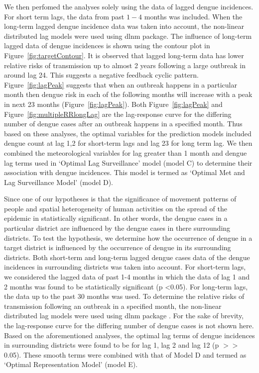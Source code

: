 \documentclass{bmcart}
\begin{document}
We then perfomed the analyses solely using the data of lagged dengue incidences. For short term lags, the data from past $1-4$ months was included. When the long-term lagged dengue incidence data was taken into account, the non-linear distributed lag models were used using dlnm package\cite{gasparrini2011distributed}. The influence of long-term lagged data of dengue incidences is shown using the contour plot in Figure~\ref{fig:targetContour}. It is observed that lagged long-term data has lower relative risks of transmission up to almost 2 years following a large outbreak in around lag 24. This suggests a negative feedback cyclic pattern. Figure~\ref{fig:lagPeak} suggests that when an outbreak happens in a particular month then dengue risk in each of the following months will increase with a peak in next 23 months (Figure~\ref{fig:lagPeak}). Both Figure~\ref{fig:lagPeak} and Figure~\ref{fig:multipleRRlongLag} are the lag-response curve for the differing number of dengue cases after an outbreak happens in a specified month. Thus based on these  analyses, the optimal variables for the prediction models included dengue count at lag 1,2 for short-term lags and lag 23 for long term lag. We then combined the meteorological variables for lag greater than 1 month and dengue lag terms used in `Optimal Lag Surveillance' model (model C) to determine their association with dengue incidences. This model is termed as `Optimal Met and Lag Surveillance Model' (model D). 



Since one of our hypotheses is that the significance of movement patterns of people and spatial heterogeneity of human activities on the spread of the epidemic in statistically significant. In other words, the dengue cases in a particular district are influenced by the dengue cases in there surrounding districts. To test the hypothesis, we determine how the occurrence of dengue in a target district is influenced by the occurrence of dengue in its surrounding districts. Both short-term and long-term lagged dengue cases data of the dengue incidences in surrounding districts was taken into account. For short-term lags, we considered the lagged data of past 1-4 months in which the data of lag 1 and 2 months was found to be statistically significant (p \textless 0.05). For long-term lags, the data up to the past 30 months was used. To determine the relative risks of transmission following an outbreak in a specified month, the non-linear distributed lag models were used using dlnm package \cite{gasparrini2011distributed}. For the sake of brevity, the lag-response curve for the differing number of dengue cases is not shown here. Based on the aforementioned analyses, the optimal lag terms of dengue incidences in surrounding districts were found to be for lag 1, lag 2 and lag 12 (p \(>\!\!>\) 0.05).  These smooth terms were combined with that of Model D and termed as `Optimal Representation Model' (model E).
\end{document}
